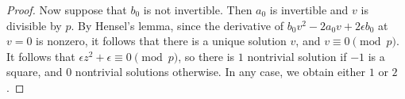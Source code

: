 \documentclass[10pt,a4paper]{amsart}
\begin{document}
\begin{proof}
Now suppose that $b_0$ is not invertible. Then $a_0$ is invertible and $v$ is divisible by $p$. By Hensel's lemma, since the derivative of $b_0v^2-2a_0v+2\epsilon b_0$ at $v=0$ is nonzero, it follows that there is a unique solution $v$, and $v\equiv 0 \pmod p$. It follows that $\epsilon z^2+\epsilon\equiv 0 \pmod p$, so there is $1$ nontrivial solution if $-1$ is a square, and $0$ nontrivial solutions otherwise. In any case, we obtain either $1$ or $2$.
\end{proof}
\end{document}
